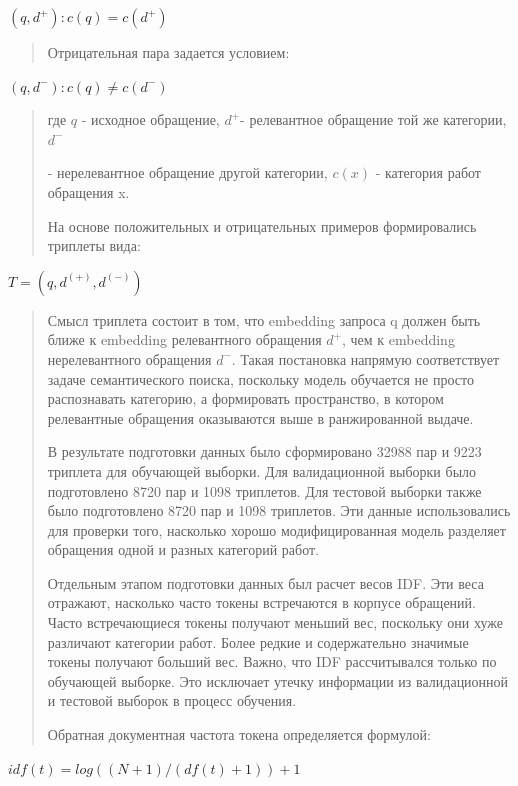 \documentclass[
]{article}
\begin{document}
\(\left( q,d^{+} \right):c(q) = c\left( d^{+} \right)\)

\begin{quote}
Отрицательная пара задается условием:
\end{quote}

\(\left( q,d^{-} \right):c(q) \neq c\left( d^{-} \right)\)

\begin{quote}
где \(q\) - исходное обращение, \(d^{+}\)- релевантное обращение той же
категории, \(d^{-}\)

- нерелевантное обращение другой категории, \(c(x)\) - категория работ
обращения x.

На основе положительных и отрицательных примеров формировались триплеты
вида:
\end{quote}

\(T = \left( q,d^{( + )},d^{( - )} \right)\)

\begin{quote}
Смысл триплета состоит в том, что embedding запроса q должен быть ближе
к embedding релевантного обращения \(d^{+}\), чем к embedding
нерелевантного обращения \(d^{-}\). Такая постановка напрямую
соответствует задаче семантического поиска, поскольку модель обучается
не просто распознавать категорию, а формировать пространство, в котором
релевантные обращения оказываются выше в ранжированной выдаче.

В результате подготовки данных было сформировано 32988 пар и 9223
триплета для обучающей выборки. Для валидационной выборки было
подготовлено 8720 пар и 1098 триплетов. Для тестовой выборки также было
подготовлено 8720 пар и 1098 триплетов. Эти данные использовались для
проверки того, насколько хорошо модифицированная модель разделяет
обращения одной и разных категорий работ.

Отдельным этапом подготовки данных был расчет весов IDF. Эти веса
отражают, насколько часто токены встречаются в корпусе обращений. Часто
встречающиеся токены получают меньший вес, поскольку они хуже различают
категории работ. Более редкие и содержательно значимые токены получают
больший вес. Важно, что IDF рассчитывался только по обучающей выборке.
Это исключает утечку информации из валидационной и тестовой выборок в
процесс обучения.

Обратная документная частота токена определяется формулой:
\end{quote}

\(idf(t) = log\left( (N + 1)/\left( df(t) + 1 \right) \right) + 1\)
\end{document}
